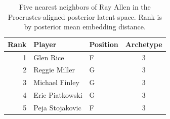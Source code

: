 \begin{table}[htbp]
  \centering\small
  \begin{tabular}{rllc}
    \toprule
    Rank & Player & Position & Archetype \\
    \midrule
    1 & Glen Rice & F & 3 \\
    2 & Reggie Miller & G & 3 \\
    3 & Michael Finley & G & 3 \\
    4 & Eric Piatkowski & G & 3 \\
    5 & Peja Stojakovic & F & 3 \\
    \bottomrule
  \end{tabular}
  \caption{Five nearest neighbors of Ray Allen in the Procrustes-aligned posterior latent space. Rank is by posterior mean embedding distance.}
  \label{tab:Ray_Allen_neighbors}
\end{table}


